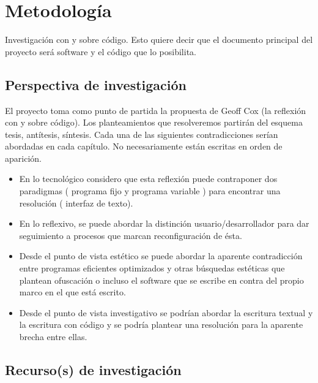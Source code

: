 \section{Metodología}


Investigación con y sobre código. Esto quiere decir que el documento principal del proyecto será software y el código que lo posibilita.

\subsection{Perspectiva de investigación}

El proyecto toma como punto de partida la propuesta de Geoff Cox (la reflexión con y sobre código). Los planteamientos que resolveremos partirán del esquema tesis, antítesis, síntesis. Cada una de las siguientes contradicciones serían abordadas en cada capítulo. No necesariamente están escritas en orden de aparición.


\begin{itemize}

\item En lo tecnológico considero que esta reflexión puede contraponer dos paradigmas ( programa fijo y programa variable ) para encontrar una resolución ( interfaz de texto).  

\item En lo reflexivo, se puede abordar la distinción usuario/desarrollador para dar seguimiento a procesos que marcan reconfiguración de ésta.

\item Desde el punto de vista estético se puede abordar la aparente contradicción entre programas eficientes optimizados y otras búsquedas estéticas que plantean ofuscación o incluso el software que se escribe en contra del propio marco en el que está escrito.

\item Desde el punto de vista investigativo se podrían abordar la escritura textual y la escritura con código y se podría plantear una resolución para la aparente brecha entre ellas.

\end{itemize}

\subsection{Recurso(s) de investigación}

